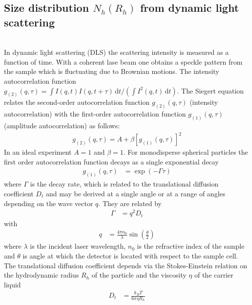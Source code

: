\subsection{Size distribution $N_h(R_h)$ from dynamic light scattering}~\\
\label{sec:DLS}
In dynamic light scattering (DLS) the scattering intensity is measured as a function of time. With a coherent lase beam one obtains a speckle pattern from the sample which is fluctuating due to Brownian motions. The intensity autocorrelation function $g_{(2)}(q,\tau)=\int  I(q,t) I(q,t+\tau)\,\mathrm{d}t/\left(\int  I^2(q,t)\,\mathrm{d}t\right)$. The Siegert equation relates the second-order autocorrelation function $g_{(2)}(q,\tau)$ (intensity autocorrelation) with the first-order autocorrelation function $g_{(1)}(q,\tau)$ (amplitude autocorrelation) as follows:
\begin{align}
    \label{eq:siegert}
    g_{(2)}(q,\tau)= A+\beta\left[g_{(1)}(q,\tau)\right]^2
\end{align}
In an ideal experiment $A=1$ and $\beta=1$. For monodisperse spherical particles the first order autocorrelation function decays as a single exponential decay
\begin{align}
    g_{(1)}(q,\tau) &= \exp\left(-\Gamma\tau\right)
\end{align}
where $\Gamma$ is the decay rate, which is related to the translational diffusion coefficient $D_t$ and may be derived at a single angle or at a range of angles depending on the wave vector $q$. They are related by
\begin{align}\label{eq:GammaDq2}
\Gamma &=q^2D_t
\end{align}
with
\begin{align}
\label{eq:q}
 q &= \frac{4\pi n_0}{\lambda}\sin\left(\frac{\theta}{2}\right)
\end{align}
where $\lambda$ is the incident laser wavelength, $n_0$ is the refractive index of the sample and $\theta$ is angle at which the detector is located with respect to the sample cell. The translational diffusion coefficient depends via the Stokes-Einstein relation on the hydrodynamic radius $R_h$ of the particle and the viscosity $\eta$ of the carrier liquid
\begin{align}
\label{eq:D_t}
D_t &= \frac{k_BT}{6\pi\eta R_h}
\end{align}


